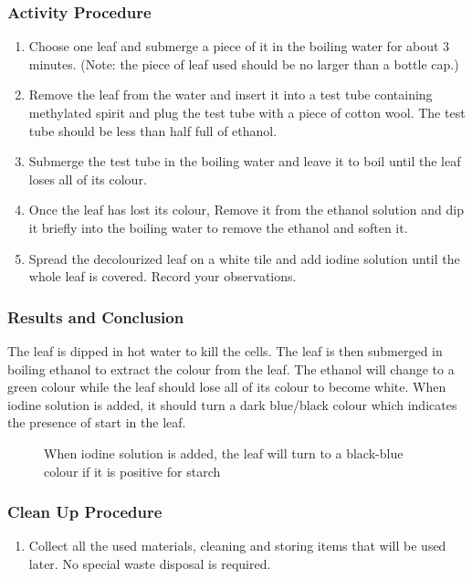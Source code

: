 \subsubsection*{Activity Procedure}
\begin{enumerate}
\item{Choose one leaf and submerge a piece of it in the boiling water for about 3 minutes. (Note: the piece of leaf used should be no larger than a bottle cap.)}
\item{Remove the leaf from the water and insert it into a test tube containing methylated spirit and plug the test tube with a piece of cotton wool. The test tube should be less than half full of ethanol.}
\item{Submerge the test tube in the boiling water and leave it to boil until the leaf loses all of its colour.}
\item{Once the leaf has lost its colour, Remove it from the ethanol solution and dip it briefly into the boiling water to remove the ethanol and soften it.}
\item{Spread the decolourized leaf on a white tile and add iodine solution until the whole leaf is covered. Record your observations.}
\end{enumerate}

\subsubsection*{Results and Conclusion}
The leaf is dipped in hot water to kill the cells. The leaf is then submerged in boiling ethanol to extract the colour from the leaf. The ethanol will change to a green colour while the leaf should lose all of its colour to become white. When iodine solution is added, it should turn a dark blue/black colour which indicates the presence of start in the leaf.

\begin{figure}[h]
\begin{center}
\def\svgwidth{6cm}

\caption{When iodine solution is added, the leaf will turn to a black-blue colour if it is positive for starch}
\label{fig:starch}
\end{center}
\end{figure}

\subsubsection*{Clean Up Procedure}
\begin{enumerate}
\item{Collect all the used materials, cleaning and storing items that will be used later. No special waste disposal is required.}
\end{enumerate}

